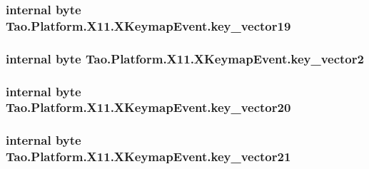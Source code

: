 \label{struct_tao_1_1_platform_1_1_x11_1_1_x_keymap_event_ac0025e7dd830019d2c7cd5d5e3b0dad0}
\hypertarget{struct_tao_1_1_platform_1_1_x11_1_1_x_keymap_event_ace444a73f5996287ee1c506166650dcf}{
\subsubsection[{key\_\-vector19}]{\setlength{\rightskip}{0pt plus 5cm}internal byte {\bf Tao.Platform.X11.XKeymapEvent.key\_\-vector19}}}
\label{struct_tao_1_1_platform_1_1_x11_1_1_x_keymap_event_ace444a73f5996287ee1c506166650dcf}
\hypertarget{struct_tao_1_1_platform_1_1_x11_1_1_x_keymap_event_a1b713fa53a5398a34c2631b9d7025433}{
\subsubsection[{key\_\-vector2}]{\setlength{\rightskip}{0pt plus 5cm}internal byte {\bf Tao.Platform.X11.XKeymapEvent.key\_\-vector2}}}
\label{struct_tao_1_1_platform_1_1_x11_1_1_x_keymap_event_a1b713fa53a5398a34c2631b9d7025433}
\hypertarget{struct_tao_1_1_platform_1_1_x11_1_1_x_keymap_event_a9fe3511350c01448801fe85cca49f83b}{
\subsubsection[{key\_\-vector20}]{\setlength{\rightskip}{0pt plus 5cm}internal byte {\bf Tao.Platform.X11.XKeymapEvent.key\_\-vector20}}}
\label{struct_tao_1_1_platform_1_1_x11_1_1_x_keymap_event_a9fe3511350c01448801fe85cca49f83b}
\hypertarget{struct_tao_1_1_platform_1_1_x11_1_1_x_keymap_event_a1214b0450ba87a2ebaa78c1b6d6e78ec}{
\subsubsection[{key\_\-vector21}]{\setlength{\rightskip}{0pt plus 5cm}internal byte {\bf Tao.Platform.X11.XKeymapEvent.key\_\-vector21}}}
